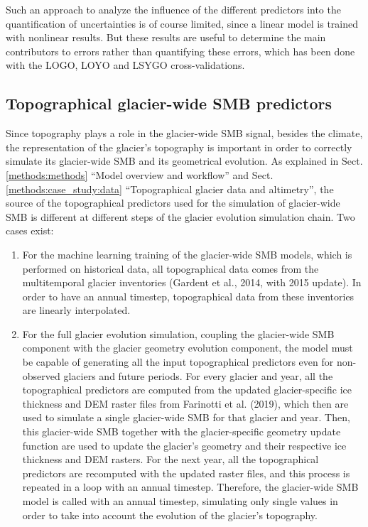 Such an approach to analyze the influence of the different predictors into the quantification of uncertainties is of course limited, since a linear model is trained with nonlinear results. But these results are useful to determine the main contributors to errors rather than quantifying these errors, which has been done with the LOGO, LOYO and LSYGO cross-validations. 

\subsection{Topographical glacier-wide SMB predictors}

Since topography plays a role in the glacier-wide SMB signal, besides the climate, the representation of the glacier’s topography is important in order to correctly simulate its glacier-wide SMB and its geometrical evolution. As explained in Sect. \ref{methods:methods} “Model overview and workflow” and Sect. \ref{methods:case_study:data} “Topographical glacier data and altimetry”, the source of the topographical predictors used for the simulation of glacier-wide SMB is different at different steps of the glacier evolution simulation chain. Two cases exist:

\begin{enumerate}
 
\item For the machine learning training of the glacier-wide SMB models, which is performed on historical data, all topographical data comes from the multitemporal glacier inventories (Gardent et al., 2014, with 2015 update). In order to have an annual timestep, topographical data from these inventories are linearly interpolated. 
\item For the full glacier evolution simulation, coupling the glacier-wide SMB component with the glacier geometry evolution component, the model must be capable of generating all the input topographical predictors even for non-observed glaciers and future periods. For every glacier and year, all the topographical predictors are computed from the updated glacier-specific ice thickness and DEM raster files from Farinotti et al. (2019), which then are used to simulate a single glacier-wide SMB for that glacier and year. Then, this glacier-wide SMB together with the glacier-specific geometry update function are used to update the glacier’s geometry and their respective ice thickness and DEM rasters. For the next year, all the topographical predictors are recomputed with the updated raster files, and this process is repeated in a loop with an annual timestep. Therefore, the glacier-wide SMB model is called with an annual timestep, simulating only single values in order to take into account the evolution of the glacier’s topography. 

\end{enumerate}


